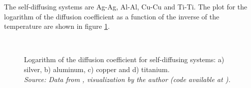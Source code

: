 The self-diffusing systems are Ag-Ag, Al-Al, Cu-Cu and Ti-Ti. The plot for the logarithm of the diffusion coefficient as a function of the inverse of the temperature are shown in figure \ref{fig:selfdiff_lnd}.  
\begin{figure}[h]
 \centering
 \captionsetup{justification=centering}
   \\
 \caption{Logarithm of the diffusion coefficient for self-diffusing systems: a) silver, b) aluminum, c) copper and d) titanium.\\ 
 \textit{Source: Data from \citep{kakusan}, visualization by the author (code available at \citep{mygit}).}}
 \label{fig:selfdiff_lnd}
\end{figure}

